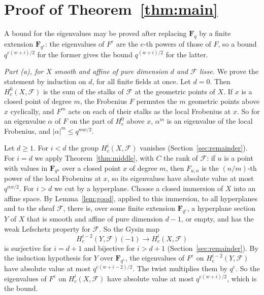 \documentclass[11pt,a4paper]{article}
\theoremstyle{plain}
\theoremstyle{remark}
\newcommand{\Fq}{\mathbf F_q}
\newcommand{\F}{\mathcal F}
\begin{document}
\section{Proof of Theorem~\ref{thm:main}}\label{sec:proof}

A bound for the eigenvalues may be proved after replacing $\Fq$ by a finite extension $\mathbf F_{q^e}$: the
eigenvalues of $F^e$ are the $e$-th powers of those of $F$, so a bound $q^{e(w+i)/2}$ for the former gives the bound
$q^{(w+i)/2}$ for the latter.

\medskip\noindent\emph{Part (a), for $X$ smooth and affine of pure dimension $d$ and $\F$ lisse.} We prove the
statement by induction on $d$, for all finite fields at once. Let $d=0$. Then $H^0_c(X,\F)$ is the sum of the stalks
of $\F$ at the geometric points of $X$. If $x$ is a closed point of degree $m$, the Frobenius $F$ permutes the $m$
geometric points above $x$ cyclically, and $F^m$ acts on each of their stalks as the local Frobenius at $x$. So for
an eigenvalue $\alpha$ of $F$ on the part of $H^0_c$ above $x$, $\alpha^m$ is an eigenvalue of the local Frobenius,
and $|\alpha|^m\le q^{mw/2}$.

Let $d\ge1$. For $i<d$ the group $H^i_c(X,\F)$ vanishes (Section~\ref{sec:remainder}). For $i=d$ we apply
Theorem~\ref{thm:middle}, with $C$ the rank of $\F$: if $u$ is a point with values in $\mathbf F_{q^n}$ over a closed
point $x$ of degree $m$, then $F_{u,n}$ is the $(n/m)$-th power of the local Frobenius at $x$, so its eigenvalues
have absolute value at most $q^{nw/2}$. For $i>d$ we cut by a hyperplane. Choose a closed immersion of $X$ into an
affine space. By Lemma~\ref{lem:good}, applied to this immersion, to all hyperplanes and to the sheaf $\F$,
there is, over some finite extension $\mathbf F_{q^{e}}$, a hyperplane section $Y$ of $X$ that is smooth and affine
of pure dimension $d-1$, or empty, and has the weak Lefschetz property for $\F$. So the Gysin map
\[
H^{i-2}_c(Y,\F)(-1)\longrightarrow H^i_c(X,\F)
\]
is surjective for $i=d+1$ and bijective for $i>d+1$ (Section~\ref{sec:remainder}). By the induction hypothesis for
$Y$ over $\mathbf F_{q^e}$, the eigenvalues of $F^e$ on $H^{i-2}_c(Y,\F)$ have absolute value at most
$q^{e(w+i-2)/2}$. The twist multiplies them by $q^e$. So the eigenvalues of $F^e$ on $H^i_c(X,\F)$ have absolute
value at most $q^{e(w+i)/2}$, which is the bound.
\end{document}
